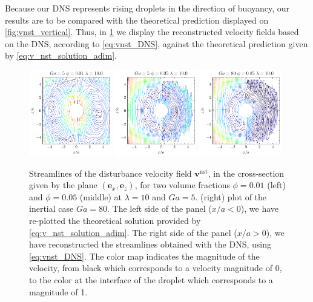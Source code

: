 Because our DNS represents rising droplets in the direction of buoyancy, our results are to be compared with the theoretical prediction displayed on \ref{fig:vnst_vertical}. 
Thus, in \ref{fig:vnst_DNS} we display the reconstructed velocity fields based on the DNS, according to \ref{eq:vnst_DNS}, against the theoretical prediction given by \ref{eq:v_nst_solution_adim}. 
\begin{figure}
    \centering
    \includegraphics[width = 0.32\textwidth]{image/HOMOGENEOUS_final/Stream/Stream_PHI_1_Ga_5_l_10.pdf}
    \includegraphics[width = 0.32\textwidth]{image/HOMOGENEOUS_final/Stream/Stream_PHI_5_Ga_5_l_10.pdf}
    \includegraphics[width = 0.32\textwidth]{image/HOMOGENEOUS_final/Stream/Stream_PHI_5_Ga_80_l_10.pdf}
    \caption{Streamlines of the disturbance velocity field $\textbf{v}^\text{nst}$, in the cross-section given by the plane $(\textbf{e}_x,\textbf{e}_z)$, for two volume fractions $\phi = 0.01$ (left) and $\phi = 0.05$ (middle) at $\lambda = 10$ and $Ga = 5$.
    (right) plot of the inertial case $Ga = 80$. 
    The left side of the panel ($x/a < 0$), we have re-plotted the theoretical solution provided by \ref{eq:v_nst_solution_adim}.   
    The right side of the panel ($x/a > 0$), we have reconstructed the streamlines obtained with the DNS, using \ref{eq:vnst_DNS}. 
    The color map indicates the magnitude of the velocity, from black which corresponds to a velocity magnitude of 0, to the color at the interface of the droplet which corresponds to a magnitude of 1.}
    \label{fig:vnst_DNS}
\end{figure}
